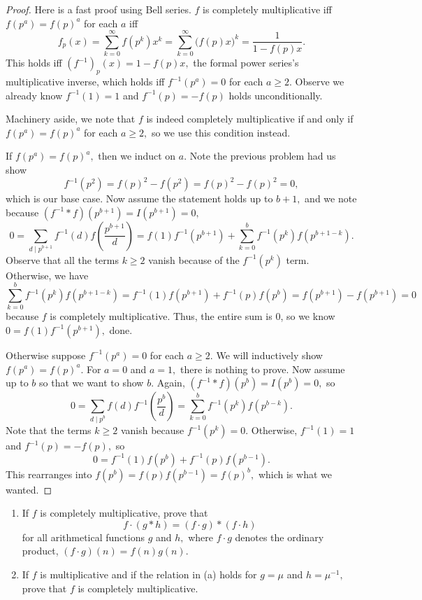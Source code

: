 \begin{proof}
Here is a fast proof using Bell series. $f$ is completely multiplicative iff $f\left(p^a\right)=f(p)^a$ for each $a$ iff
\[f_p(x)=\sum_{k=0}^\infty f\left(p^k\right)x^k=\sum_{k=0}^\infty\big(f(p)x\big)^k=\frac1{1-f(p)x}.\]
This holds iff $\left(f^{-1}\right)_p(x)=1-f(p)x,$ the formal power series's multiplicative inverse, which holds iff $f^{-1}\left(p^a\right)=0$ for each $a\ge2.$ Observe we already know $f^{-1}(1)=1$ and $f^{-1}(p)=-f(p)$ holds unconditionally.

Machinery aside, we note that $f$ is indeed completely multiplicative if and only if $f\left(p^a\right)=f(p)^a$ for each $a\ge2,$ so we use this condition instead.

If $f\left(p^a\right)=f(p)^a,$ then we induct on $a.$ Note the previous problem had us show 
\[f^{-1}\left(p^2\right)=f(p)^2-f\left(p^2\right)=f(p)^2-f(p)^2=0,\]
which is our base case. Now assume the statement holds up to $b+1,$ and we note because $\left(f^{-1}*f\right)\left(p^{b+1}\right)=I\left(p^{b+1}\right)=0,$
\[0=\sum_{d\mid p^{b+1}}f^{-1}(d)f\left(\frac{p^{b+1}}d\right)=f(1)f^{-1}\left(p^{b+1}\right)+\sum_{k=0}^bf^{-1}\left(p^k\right)f\left(p^{b+1-k}\right).\]
Observe that all the terms $k\ge2$ vanish because of the $f^{-1}\left(p^k\right)$ term. Otherwise, we have
\[\sum_{k=0}^bf^{-1}\left(p^k\right)f\left(p^{b+1-k}\right)=f^{-1}(1)f\left(p^{b+1}\right)+f^{-1}(p)f\left(p^b\right)=f\left(p^{b+1}\right)-f\left(p^{b+1}\right)=0\]
because $f$ is completely multiplicative. Thus, the entire sum is 0, so we know $0=f(1)f^{-1}\left(p^{b+1}\right),$ done.

Otherwise suppose $f^{-1}\left(p^a\right)=0$ for each $a\ge2.$ We will inductively show $f\left(p^a\right)=f(p)^a.$ For $a=0$ and $a=1,$ there is nothing to prove. Now assume up to $b$ so that we want to show $b.$ Again, $\left(f^{-1}*f\right)\left(p^b\right)=I\left(p^b\right)=0,$ so
\[0=\sum_{d\mid p^b}f(d)f^{-1}\left(\frac{p^b}d\right)=\sum_{k=0}^bf^{-1}\left(p^k\right)f\left(p^{b-k}\right).\]
Note that the terms $k\ge2$ vanish because $f^{-1}\left(p^k\right)=0.$ Otherwise, $f^{-1}(1)=1$ and $f^{-1}(p)=-f(p),$ so
\[0=f^{-1}(1)f\left(p^b\right)+f^{-1}(p)f\left(p^{b-1}\right).\]
This rearranges into $f\left(p^b\right)=f(p)f\left(p^{b-1}\right)=f(p)^b,$ which is what we wanted.
\end{proof}

\begin{exercise}
\begin{enumerate}[label=(\alph*)]
    \item If $f$ is completely multiplicative, prove that
    \[f\cdot(g*h)=(f\cdot g)*(f\cdot h)\]
    for all arithmetical functions $g$ and $h,$ where $f\cdot g$ denotes the ordinary product, $(f\cdot g)(n)=f(n)g(n).$
    \item If $f$ is multiplicative and if the relation in (a) holds for $g=\mu$ and $h=\mu^{-1},$ prove that $f$ is completely multiplicative.
\end{enumerate}
\end{exercise}

